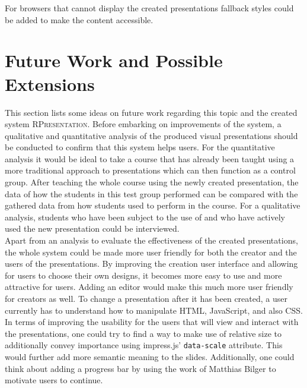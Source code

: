 \documentclass[twoside, 12pt]{article}
\newcommand{\sys}{\textsc{RPresentation}\xspace}
\begin{document}
For browsers that cannot display the created presentations fallback styles could be added to make the content accessible.



\section{Future Work and Possible Extensions}

This section lists some ideas on future work regarding this topic and the created system \sys. Before embarking on improvements of the system, a qualitative and quantitative analysis of the produced visual presentations should be conducted to confirm that this system helps users. For the quantitative analysis it would be ideal to take a course that has already been taught using a more traditional approach to presentations which can then function as a control group. After teaching the whole course using the newly created presentation, the data of how the students in this test group performed can be compared with the gathered data from how students used to perform in the course. For a qualitative analysis, students who have been subject to the use of and who have actively used the new presentation could be interviewed.\\

Apart from an analysis to evaluate the effectiveness of the created presentations, the whole system could be made more user friendly for both the creator and the users of the presentations. By improving the creation user interface and allowing for users to choose their own designs, it becomes more easy to use and more attractive for users. Adding an editor would make this much more user friendly for creators as well. To change a presentation after it has been created, a user currently has to understand how to manipulate HTML, JavaScript, and also CSS.\\

In terms of improving the usability for the users that will view and interact with the presentations, one could try to find a way to make use of relative size to additionally convey importance using impress.js' \texttt{data-scale} attribute. This would further add more semantic meaning to the slides. Additionally, one could think about adding a progress bar by using the work of Matthias Bilger \cite{bilger:npentrel15} to motivate users to continue.\\
\end{document}
